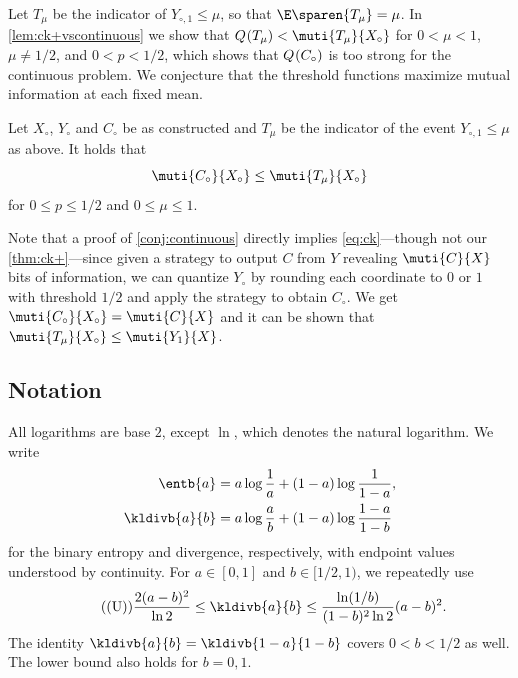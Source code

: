 Let $T_\mu$ be the indicator of
$Y_{\circ,1}\le \mu$, so that $\E\sparen{T_\mu}=\mu$. In
\autoref{lem:ck+vscontinuous} we show that
$\qent{T_\mu} < \muti{T_\mu}{X_\circ}$ for $0<\mu<1$,
$\mu\ne1/2$, and $0<p<1/2$, which shows that $Q{\mkern-2mu}\left(C_\circ\right)$
is too strong for the continuous problem. We conjecture that
the threshold functions maximize mutual information at
each fixed mean.
\begin{conjecture}
\label{conj:continuous}
Let $X_\circ$, $Y_\circ$ and $C_\circ$ be as constructed
and $T_\mu$ be the indicator of the event $Y_{\circ,1}\le\mu$
as above. It holds that
\begin{equation*}
  \muti{C_\circ}{X_\circ}\le\muti{T_\mu}{X_\circ}
\end{equation*}
for $0\le p\le1/2$ and $0\le\mu\le1$.
\end{conjecture}

Note that a proof of \autoref{conj:continuous} directly
implies \eqref{eq:ck}---though not our
\autoref{thm:ck+}---since given a strategy to output $C$
from $Y$ revealing $\muti{C}{X}$ bits of information, we can
quantize $Y_\circ$ by rounding each coordinate to $0$ or $1$
with threshold $1/2$ and apply the strategy to obtain
$C_\circ$. We get $\muti{C_\circ}{X_\circ}=\muti{C}{X}$
and it can be shown that
$\muti{T_\mu}{X_\circ}\le\muti{Y_1}{X}$.
\iffalse 
\subsection{Notation}
\label{sec:notation}
All logarithms are base $2$, except $\ln$, which denotes the
natural logarithm. We write
\begin{align*}
 \entb{a}     &=a\log \frac{1}{a}+ (1-a)\log\frac{1}{1-a},\\
 \kldivb{a}{b}&=a\log\frac ab+(1-a)\log\frac{1-a}{1-b}
\end{align*}
for the binary entropy and divergence, respectively, with endpoint
values understood by continuity.
For $a\in[0,1]$ and $b\in[1/2,1)$, we repeatedly use
\begin{equation}
\tag{(U)}
\label{eq:U}
 \frac{2(a-b)^2}{\ln2}
 \le\kldivb{a}{b}
 \le\frac{\ln(1/b)}{(1-b)^2\ln2}(a-b)^2.
\end{equation}
The identity $\kldivb{a}{b}=\kldivb{1-a}{1-b}$ covers
$0<b<1/2$ as well. The lower bound also holds for $b=0,1$.

